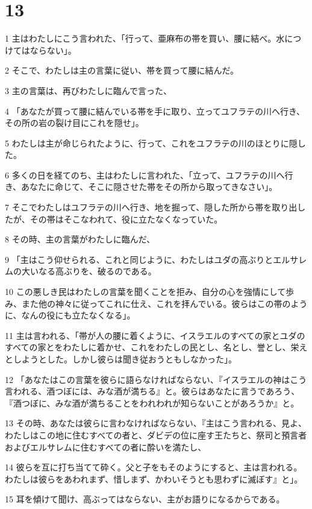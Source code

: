 \chapter{13}

\par 1 主はわたしにこう言われた、「行って、亜麻布の帯を買い、腰に結べ。水につけてはならない」。
\par 2 そこで、わたしは主の言葉に従い、帯を買って腰に結んだ。
\par 3 主の言葉は、再びわたしに臨んで言った、
\par 4 「あなたが買って腰に結んでいる帯を手に取り、立ってユフラテの川へ行き、その所の岩の裂け目にこれを隠せ」。
\par 5 わたしは主が命じられたように、行って、これをユフラテの川のほとりに隠した。
\par 6 多くの日を経てのち、主はわたしに言われた、「立って、ユフラテの川へ行き、あなたに命じて、そこに隠させた帯をその所から取ってきなさい」。
\par 7 そこでわたしはユフラテの川へ行き、地を掘って、隠した所から帯を取り出したが、その帯はそこなわれて、役に立たなくなっていた。
\par 8 その時、主の言葉がわたしに臨んだ、
\par 9 「主はこう仰せられる、これと同じように、わたしはユダの高ぶりとエルサレムの大いなる高ぶりを、破るのである。
\par 10 この悪しき民はわたしの言葉を聞くことを拒み、自分の心を強情にして歩み、また他の神々に従ってこれに仕え、これを拝んでいる。彼らはこの帯のように、なんの役にも立たなくなる」。
\par 11 主は言われる、「帯が人の腰に着くように、イスラエルのすべての家とユダのすべての家とをわたしに着かせ、これをわたしの民とし、名とし、誉とし、栄えとしようとした。しかし彼らは聞き従おうともしなかった」。
\par 12 「あなたはこの言葉を彼らに語らなければならない、『イスラエルの神はこう言われる、酒つぼには、みな酒が満ちる』と。彼らはあなたに言うであろう、『酒つぼに、みな酒が満ちることをわれわれが知らないことがあろうか』と。
\par 13 その時、あなたは彼らに言わなければならない、『主はこう言われる、見よ、わたしはこの地に住むすべての者と、ダビデの位に座す王たちと、祭司と預言者およびエルサレムに住むすべての者に酔いを満たし、
\par 14 彼らを互に打ち当てて砕く。父と子をもそのようにすると、主は言われる。わたしは彼らをあわれまず、惜しまず、かわいそうとも思わずに滅ぼす』と」。
\par 15 耳を傾けて聞け、高ぶってはならない、主がお語りになるからである。
